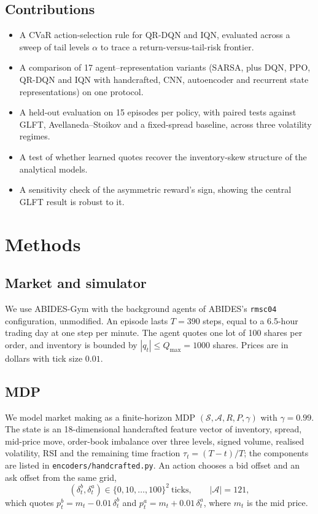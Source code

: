 \documentclass[10pt,twocolumn]{article}
\begin{document}
\subsection{Contributions}
\begin{itemize}
  \item A CVaR action-selection rule for QR-DQN and IQN, evaluated across a sweep of tail levels $\alpha$ to trace a return-versus-tail-risk frontier.
  \item A comparison of 17 agent--representation variants (SARSA, plus DQN, PPO, QR-DQN and IQN with handcrafted, CNN, autoencoder and recurrent state representations) on one protocol.
  \item A held-out evaluation on 15 episodes per policy, with paired tests against GLFT, Avellaneda--Stoikov and a fixed-spread baseline, across three volatility regimes.
  \item A test of whether learned quotes recover the inventory-skew structure of the analytical models.
  \item A sensitivity check of the asymmetric reward's sign, showing the central GLFT result is robust to it.
\end{itemize}

\section{Methods}
\label{sec:methods}

\subsection{Market and simulator}
We use ABIDES-Gym \citep{amrouni2021} with the background agents of ABIDES's \texttt{rmsc04} configuration, unmodified. An episode lasts $T=390$ steps, equal to a 6.5-hour trading day at one step per minute. The agent quotes one lot of 100 shares per order, and inventory is bounded by $|q_t|\le Q_{\max}=1000$ shares. Prices are in dollars with tick size $0.01$.

\subsection{MDP}
We model market making as a finite-horizon MDP $(\mathcal S,\mathcal A,R,P,\gamma)$ with $\gamma=0.99$. The state is an 18-dimensional handcrafted feature vector of inventory, spread, mid-price move, order-book imbalance over three levels, signed volume, realised volatility, RSI and the remaining time fraction $\tau_t=(T-t)/T$; the components are listed in \texttt{encoders/handcrafted.py}. An action chooses a bid offset and an ask offset from the same grid,
\begin{equation}
  (\delta^b_t,\delta^a_t)\in\{0,10,\dots,100\}^2\ \text{ticks},\qquad |\mathcal A|=121,
\end{equation}
which quotes $p^b_t=m_t-0.01\,\delta^b_t$ and $p^a_t=m_t+0.01\,\delta^a_t$, where $m_t$ is the mid price.
\end{document}
